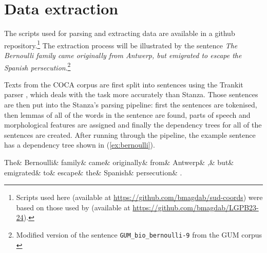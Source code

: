 \newpage

\section{Data extraction}

The scripts used for parsing and extracting data are available in a github repository.\footnote{Scripts used here (available at \url{https://github.com/bmagdab/sud-coords}) were based on those used by \cite{prz:etal:24} (available at \url{https://github.com/bmagdab/LGPB23-24}).} The extraction process will be illustrated by the sentence \textsl{The Bernoulli family came originally from Antwerp, but emigrated to escape the Spanish persecution}.\footnote{Modified version of the sentence \texttt{GUM\_bio\_bernoulli-9} from the GUM corpus \citep{Zeldes2017}} 

Texts from the COCA corpus are first split into sentences using the Trankit parser \citep{nguyen2021trankit}, which deals with the task more accurately than Stanza. Those sentences are then put into the Stanza's parsing pipeline: first the sentences are tokenised, then lemmas of all of the words in the sentence are found, parts of speech and morphological features are assigned and finally the dependency trees for all of the sentences are created. After running through the pipeline, the example sentence has a dependency tree shown in (\ref{ex:bernoulli}). 

\begin{adjustwidth}{-90pt}{70pt}
\small
\begin{exe}
\ex\label{ex:bernoulli}
\begin{dependency}[baseline=-\the\dimexpr\fontdimen22\textfont2\relax]
	\begin{deptext}
		 The\& Bernoulli\& family\& came\& originally\& from\& Antwerp\& ,\& but\& emigrated\& to\& escape\& the\& Spanish\& persecution\& .\\
	 \end{deptext} 
\end{dependency}
\end{exe}
\end{adjustwidth}

